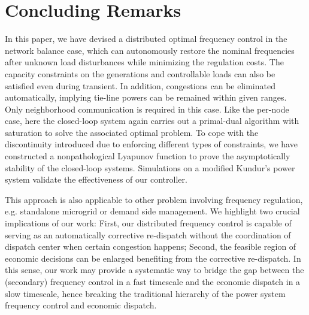 
\section{Concluding Remarks}
In this paper, we have devised a distributed optimal frequency control in the network balance case, which can autonomously restore the nominal frequencies after unknown load disturbances while minimizing the regulation costs. The capacity constraints on the generations and  controllable loads can also be satisfied even during transient. In addition, congestions can be eliminated automatically, implying tie-line powers can be remained within given ranges. Only neighborhood communication is required in this case. Like the per-node case, here the closed-loop system again carries out a primal-dual algorithm with saturation to solve the associated optimal problem. To cope with the discontinuity introduced due to enforcing different types of constraints, we have constructed a nonpathological Lyapunov function to prove the asymptotically stability of the closed-loop systems. Simulations on a modified Kundur's power system validate the effectiveness of our controller. 

This approach is also applicable to other problem involving frequency regulation, e.g. standalone microgrid or demand side management. We highlight two crucial implications of our work: First, our distributed frequency control is capable of serving as an automatically corrective re-dispatch without the coordination of dispatch center when certain congestion happens; Second, the feasible region of economic decisions can be enlarged  benefiting from the corrective re-dispatch. 
In this sense, our work may provide a systematic way to bridge the gap between  the (secondary) frequency control in a fast timescale  and the economic dispatch in a slow timescale, hence breaking the traditional hierarchy of the power system frequency control and economic dispatch.
    
    
 
    
    
    